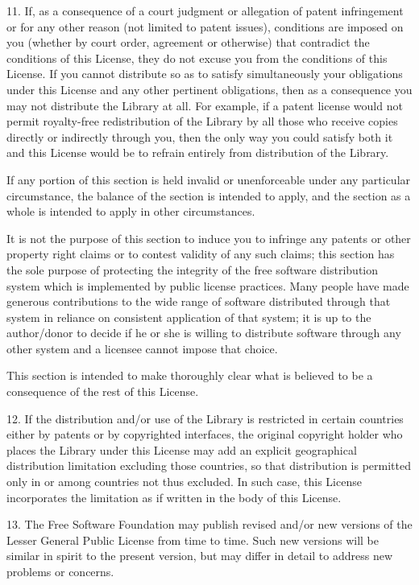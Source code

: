 11. If, as a consequence of a court judgment or allegation of patent
infringement or for any other reason (not limited to patent issues),
conditions are imposed on you (whether by court order, agreement or
otherwise) that contradict the conditions of this License, they do not excuse
you from the conditions of this License.  If you cannot distribute so as to
satisfy simultaneously your obligations under this License and any other
pertinent obligations, then as a consequence you may not distribute the
Library at all.  For example, if a patent license would not permit
royalty-free redistribution of the Library by all those who receive copies
directly or indirectly through you, then the only way you could satisfy both
it and this License would be to refrain entirely from distribution of the
Library.

If any portion of this section is held invalid or unenforceable under any
particular circumstance, the balance of the section is intended to apply, and
the section as a whole is intended to apply in other circumstances.

It is not the purpose of this section to induce you to infringe any patents or
other property right claims or to contest validity of any such claims; this
section has the sole purpose of protecting the integrity of the free software
distribution system which is implemented by public license practices.  Many
people have made generous contributions to the wide range of software
distributed through that system in reliance on consistent application of that
system; it is up to the author/donor to decide if he or she is willing to
distribute software through any other system and a licensee cannot impose that
choice.

This section is intended to make thoroughly clear what is believed to be a
consequence of the rest of this License.

12. If the distribution and/or use of the Library is restricted in certain
countries either by patents or by copyrighted interfaces, the original
copyright holder who places the Library under this License may add an
explicit geographical distribution limitation excluding those countries, so
that distribution is permitted only in or among countries not thus excluded.
In such case, this License incorporates the limitation as if written in the
body of this License.

13. The Free Software Foundation may publish revised and/or new versions of
the Lesser General Public License from time to time.  Such new versions will
be similar in spirit to the present version, but may differ in detail to
address new problems or concerns.

